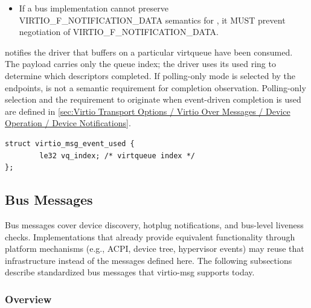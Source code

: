\begin{itemize}
  \item If a bus implementation cannot preserve
        VIRTIO\_F\_NOTIFICATION\_DATA semantics for , it
        MUST prevent negotiation of VIRTIO\_F\_NOTIFICATION\_DATA.
\end{itemize}


 notifies the driver that buffers on a particular virtqueue
have been consumed. The payload carries only the queue index; the driver uses
its used ring to determine which descriptors completed. If polling-only mode is
selected by the endpoints,  is not a semantic requirement
for completion observation. Polling-only selection and the requirement to
originate  when event-driven completion is used are defined
in
\ref{sec:Virtio Transport Options / Virtio Over Messages / Device Operation / Device Notifications}.

\begin{lstlisting}
struct virtio_msg_event_used {
        le32 vq_index; /* virtqueue index */
};
\end{lstlisting}


\subsection{Bus Messages}\label{sec:Virtio Transport Options / Virtio Over Messages / Bus Messages}

Bus messages cover device discovery, hotplug notifications, and bus-level
liveness checks. Implementations that already provide equivalent functionality
through platform mechanisms (e.g., ACPI, device tree, hypervisor events) may
reuse that infrastructure instead of the messages defined here. The following
subsections describe standardized bus messages that virtio-msg supports today.

\subsubsection{Overview}
\label{sec:Virtio Transport Options / Virtio Over Messages / Bus Messages / Overview}

